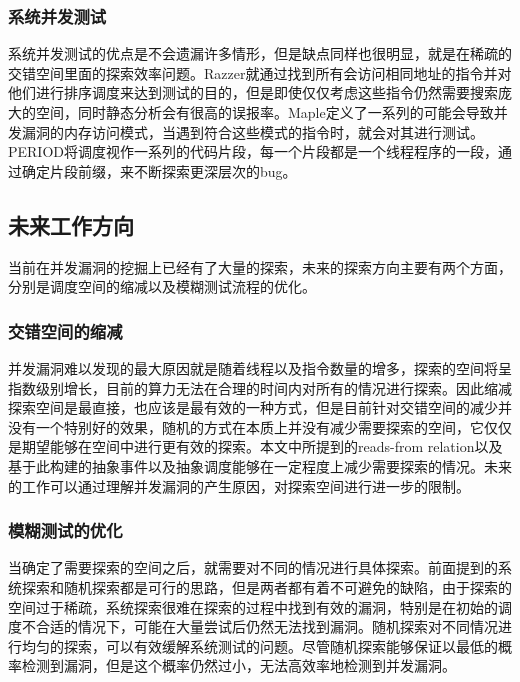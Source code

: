 \subsubsection{系统并发测试}

系统并发测试的优点是不会遗漏许多情形，但是缺点同样也很明显，就是在稀疏的交错空间里面的探索效率问题。Razzer就通过找到所有会访问相同地址的指令并对他们进行排序调度来达到测试的目的，但是即使仅仅考虑这些指令仍然需要搜索庞大的空间，同时静态分析会有很高的误报率。Maple\cite{yu2012maple}定义了一系列的可能会导致并发漏洞的内存访问模式，当遇到符合这些模式的指令时，就会对其进行测试。PERIOD\cite{wen2022controlled}将调度视作一系列的代码片段，每一个片段都是一个线程程序的一段，通过确定片段前缀，来不断探索更深层次的bug。

\subsection{未来工作方向}

当前在并发漏洞的挖掘上已经有了大量的探索，未来的探索方向主要有两个方面，分别是调度空间的缩减以及模糊测试流程的优化。

\subsubsection{交错空间的缩减}

并发漏洞难以发现的最大原因就是随着线程以及指令数量的增多，探索的空间将呈指数级别增长，目前的算力无法在合理的时间内对所有的情况进行探索。因此缩减探索空间是最直接，也应该是最有效的一种方式，但是目前针对交错空间的减少并没有一个特别好的效果，随机的方式在本质上并没有减少需要探索的空间，它仅仅是期望能够在空间中进行更有效的探索。本文中所提到的reads-from relation以及基于此构建的抽象事件以及抽象调度能够在一定程度上减少需要探索的情况。未来的工作可以通过理解并发漏洞的产生原因，对探索空间进行进一步的限制。

\subsubsection{模糊测试的优化}

当确定了需要探索的空间之后，就需要对不同的情况进行具体探索。前面提到的系统探索和随机探索都是可行的思路，但是两者都有着不可避免的缺陷，由于探索的空间过于稀疏，系统探索很难在探索的过程中找到有效的漏洞，特别是在初始的调度不合适的情况下，可能在大量尝试后仍然无法找到漏洞。随机探索对不同情况进行均匀的探索，可以有效缓解系统测试的问题。尽管随机探索能够保证以最低的概率检测到漏洞，但是这个概率仍然过小，无法高效率地检测到并发漏洞。

